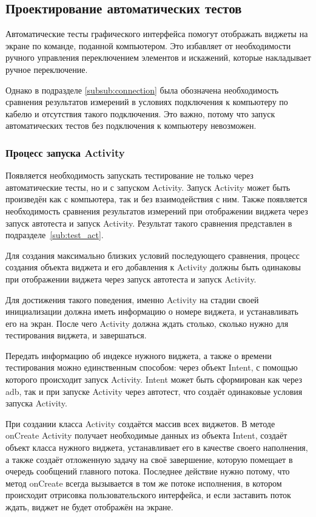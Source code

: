 \documentclass[a4paper,14pt]{extarticle} %
\begin{document}
	\subsection{Проектирование автоматических тестов}
	
	Автоматические тесты графического интерфейса помогут отображать виджеты на экране по команде, поданной компьютером. Это избавляет от необходимости ручного управления переключением элементов и искажений, которые накладывает ручное переключение.
	
	Однако в подразделе \ref{subsub:connection} была обозначена необходимость сравнения результатов измерений в условиях подключения к компьютеру по кабелю и отсутствия такого подключения. Это важно, потому что запуск автоматических тестов без подключения к компьютеру невозможен. 
	
	\subsubsection{Процесс запуска Activity}\label{subsub:activity_start}
	
	Появляется необходимость запускать тестирование не только через автоматические тесты, но и с запуском Activity. Запуск Activity может быть произведён как с компьютера, так и без взаимодействия с ним. Также появляется необходимость сравнения результатов измерений при отображении виджета через запуск автотеста и запуск Activity. Результат такого сравнения представлен в подразделе~\ref{sub:test_act}.
	
	Для создания максимально близких условий последующего сравнения, процесс создания объекта виджета и его добавления к Activity должны быть одинаковы при отображении виджета через запуск автотеста и запуск Activity.
	
	Для достижения такого поведения, именно Activity на стадии своей инициализации должна иметь информацию о номере виджета, и устанавливать его на экран. После чего Activity должна ждать столько, сколько нужно для тестирования виджета, и завершаться. 
	
	Передать информацию об индексе нужного виджета, а также о времени тестирования можно единственным способом: через объект Intent, с помощью которого происходит запуск Activity. Intent может быть сформирован как через adb, так и при запуске Activity через автотест, что создаёт одинаковые условия запуска Activity.
	
	При создании класса Activity создаётся массив всех виджетов. В методе onCreate Activity получает необходимые данных из объекта Intent, создаёт объект класса нужного виджета, устанавливает его в качестве своего наполнения, а также создаёт отложенную задачу на своё завершение, которую помещает в очередь сообщений главного потока. Последнее действие нужно потому, что метод onCreate всегда вызывается в том же потоке исполнения, в котором происходит отрисовка пользовательского интерфейса, и если заставить поток ждать, виджет не будет отображён на экране.
	
\end{document}
